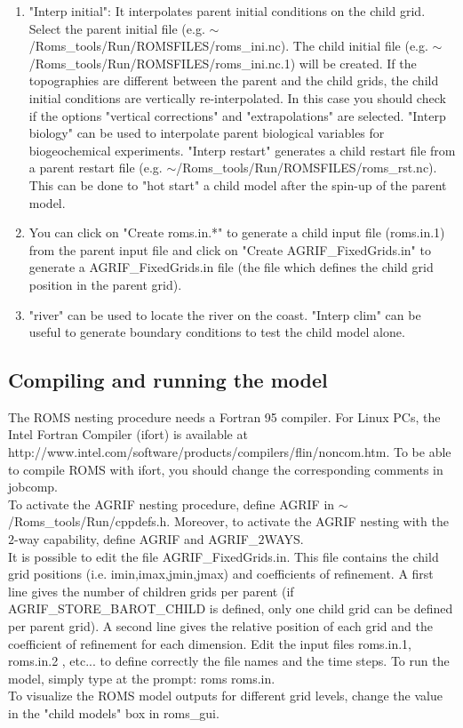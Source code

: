 \begin{enumerate}
\item "Interp initial": It interpolates parent initial
conditions on the child grid. Select the parent initial file
(e.g. $\sim$/Roms\_tools/Run/ROMSFILES/roms\_ini.nc).
The child initial file 
(e.g. $\sim$/Roms\_tools/Run/ROMSFILES/roms\_ini.nc.1) 
will be created.
If the topographies are different between the parent and 
the child grids, the child initial conditions are 
vertically re-interpolated. In this case you should check 
if the options "vertical corrections" and "extrapolations"
are selected.
"Interp biology" can be used to interpolate
parent biological variables for biogeochemical experiments.
"Interp restart" generates a child restart file from 
a parent restart file 
(e.g. $\sim$/Roms\_tools/Run/ROMSFILES/roms\_rst.nc). 
This can be done to "hot start" a child model after the 
spin-up of the parent model.

\item You can click on "Create roms.in.*" to generate a
child input file (roms.in.1) from the parent input
file and click on "Create AGRIF\_FixedGrids.in" to 
generate a AGRIF\_FixedGrids.in file (the file which
defines the child grid position in the parent grid).

\item "river" can be used to locate the river on the coast.
"Interp clim" can be useful to generate boundary conditions 
to test the child model alone. 
\end{enumerate}
\subsection{Compiling and running the model}
The ROMS nesting procedure needs a Fortran 95 compiler. For Linux PCs,
the Intel Fortran Compiler (ifort) is available at \\
http://www.intel.com/software/products/compilers/flin/noncom.htm.  To be able to
compile ROMS with ifort, you should change the corresponding
comments in jobcomp. \\

To activate the AGRIF nesting procedure, define AGRIF in
$\sim$/Roms\_tools/Run/cppdefs.h. Moreover, to activate the AGRIF nesting with the
$2$-way capability, define AGRIF and AGRIF\_$2$WAYS. \\




It is possible to edit the file AGRIF\_FixedGrids.in.  This file contains the child
grid positions (i.e. imin,imax,jmin,jmax) and coefficients of refinement. A first
line gives the number of children grids per parent (if AGRIF\_STORE\_BAROT\_CHILD is
defined, only one child grid can be defined per parent grid). A second line gives the
relative position of each grid and the coefficient of refinement for each dimension.
Edit the input files roms.in.1, roms.in.2 , etc... to define correctly the file names
and the time steps. To run the model, simply type at the prompt: roms roms.in. \\

To visualize the ROMS model outputs for different grid levels, 
change the value in the "child models" box
in roms\_gui.


